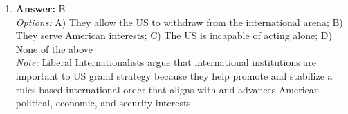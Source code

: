 \documentclass[12pt]{article}
\begin{document}
\begin{enumerate}[label=\arabic*.]
\\ \textit{Note:} The Strategic Arms Reduction Treaty (START) was groundbreaking as it established the first legally binding framework for the reduction and elimination of long-range nuclear missile arsenals, marking a significant step towards arms control during the Cold War.
\item \textbf{Answer:} B
\\ \textit{Options:} A) They allow the US to withdraw from the international arena; B) They serve American interests; C) The US is incapable of acting alone; D) None of the above
\\ \textit{Note:} Liberal Internationalists argue that international institutions are important to US grand strategy because they help promote and stabilize a rules-based international order that aligns with and advances American political, economic, and security interests.
\end{enumerate}
\end{document}
